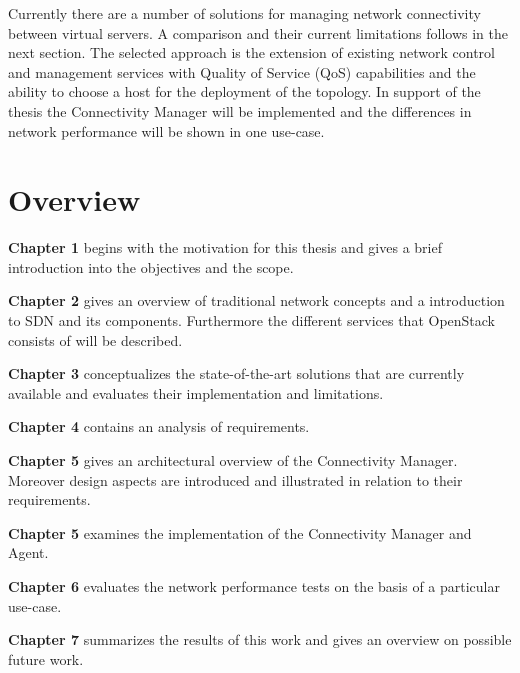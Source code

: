 Currently there are a number of solutions for managing network connectivity between virtual servers. A comparison and their current limitations follows in the next section. The selected approach is the extension of existing network control and management services with Quality of Service (QoS) capabilities and the ability to choose a host for the deployment of the topology. In support of the thesis the Connectivity Manager will be implemented and the differences in network performance will be shown in one use-case.

\section{Overview}

\textbf{Chapter 1} begins with the motivation for this thesis and gives a brief introduction into the objectives and the scope.

\textbf{Chapter 2} gives an overview of traditional network concepts and a introduction to SDN and its components. Furthermore the different services that OpenStack consists of will be described.

\textbf{Chapter 3} conceptualizes the state-of-the-art solutions that are currently available and evaluates their implementation and limitations.

\textbf{Chapter 4} contains an analysis of requirements.

\textbf{Chapter 5} gives an architectural overview of the Connectivity Manager. Moreover design aspects are introduced and illustrated in relation to their requirements.

\textbf{Chapter 5} examines the implementation of the Connectivity Manager and Agent.

\textbf{Chapter 6} evaluates the network performance tests on the basis of a particular use-case.

\textbf{Chapter 7} summarizes the results of this work and gives an overview on possible future work.


